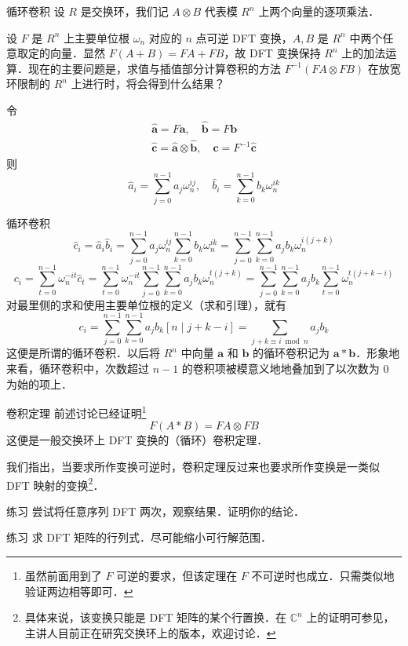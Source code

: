 \documentclass[fontset=fandol]{ctexbeamer}
\renewcommand{\vec}{\boldsymbol}
\begin{document}
\begin{frame}{循环卷积}
    设 $R$ 是\alert{交换环}，我们记 $A \otimes B$ 代表模 $R^n$ 上两个向量的逐项乘法．

    设 $F$ 是 $R^n$ 上主要单位根 $\omega_n$ 对应的 $n$ 点可逆 DFT 变换，$A,B$ 是 $R^n$ 中两个任意取定的向量．显然 $F(A+B)=FA+FB$，故 DFT 变换保持 $R^n$ 上的加法运算．现在的主要问题是，求值与插值部分计算卷积的方法 $F^{-1}(FA \otimes FB)$ 在放宽环限制的 $R^n$ 上进行时，将会得到什么结果？

    令
    \[
    \begin{gathered}
    \hat{\vec a} = F \vec a,\quad \hat{\vec b} = F \vec b \\
    \hat {\vec c}= \hat{\vec a} \otimes \hat{\vec b},\quad \vec c = F^{-1} \hat{\vec c}
    \end{gathered}
    \]
    则
    \[
    \hat a_i = \sum_{j=0}^{n-1} a_j \omega_n^{ij},\quad \hat b_i = \sum_{k=0}^{n-1} b_k \omega_n^{ik}
    \]
\end{frame}

\begin{frame}{循环卷积}
    \[
    \hat c_i = \hat a_i \hat b_i = \sum_{j=0}^{n-1} a_j \omega_n^{ij} \sum_{k=0}^{n-1} b_k \omega_n^{ik} = \sum_{j=0}^{n-1} \sum_{k=0}^{n-1} a_j b_k \omega_n^{i(j+k)}
    \]
    \[
    c_i = \sum_{t=0}^{n-1} \omega_n^{-it} \hat c_t =  \sum_{t=0}^{n-1} \omega_n^{-it} \sum_{j=0}^{n-1} \sum_{k=0}^{n-1} a_j b_k \omega_n^{t(j+k)}
    = \sum_{j=0}^{n-1} \sum_{k=0}^{n-1} a_j b_k \sum_{t=0}^{n-1} \omega_n^{t(j+k-i)}
    \]
    对最里侧的求和使用主要单位根的定义（求和引理），就有
    \[
    c_i = \sum_{j=0}^{n-1} \sum_{k=0}^{n-1} a_j b_k [n \mid j+k-i] = \sum_{j+k \equiv i \bmod{n}} a_j b_k
    \]
    这便是所谓的循环卷积．以后将 $R^n$ 中向量 $\vec a$ 和 $\vec b$ 的循环卷积记为 $\vec a * \vec b$．形象地来看，循环卷积中，次数超过 $n-1$ 的卷积项被模意义地地叠加到了以次数为 $0$ 为始的项上．
\end{frame}

\begin{frame}{卷积定理}
    前述讨论已经证明\footnote{虽然前面用到了 $F$ 可逆的要求，但该定理在 $F$ 不可逆时也成立．只需类似地验证两边相等即可．}
    $$
    F(A * B) = FA \otimes FB
    $$
    这便是一般交换环上 DFT 变换的（循环）卷积定理．

    我们指出，当要求所作变换可逆时，卷积定理反过来也要求所作变换是一类似 DFT 映射的变换\footnote{具体来说，该变换只能是 DFT 矩阵的某个行置换．在 $\mathbb C^n$ 上的证明可参见\cite{baraquin2023uniqueness}，主讲人目前正在研究交换环上的版本，欢迎讨论．}．

    \begin{exampleblock}{练习}
        尝试将任意序列 DFT 两次，观察结果．证明你的结论．
    \end{exampleblock}

    \begin{exampleblock}{练习}
        求 DFT 矩阵的行列式．尽可能缩小可行解范围．
    \end{exampleblock}
\end{frame}
\end{document}

